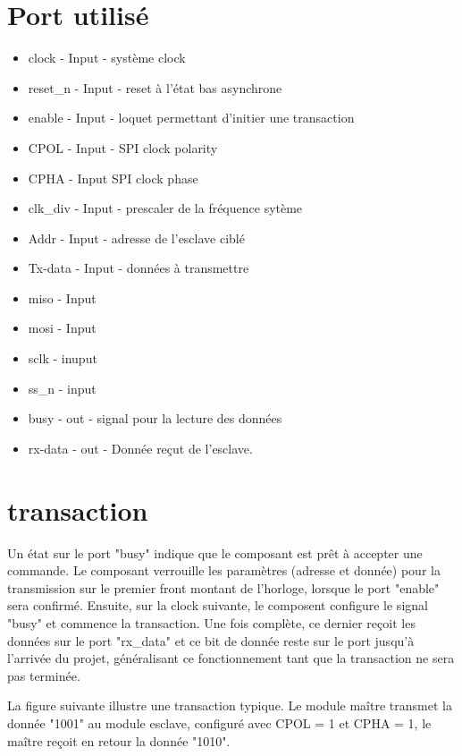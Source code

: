 \documentclass[french,a4paper,12pt]{report}
\begin{document}
	\section{Port utilisé}
		\begin{itemize}
			\item clock - Input - système clock
			\item reset\_n - Input - reset à l'état bas asynchrone
			\item enable - Input - loquet permettant d'initier une transaction
			\item CPOL - Input - SPI clock polarity
			\item CPHA - Input SPI clock phase
			\item clk\_div - Input - prescaler de la fréquence sytème
			\item Addr - Input - adresse de l'esclave ciblé
			\item Tx-data - Input - données à transmettre
			\item miso - Input
			\item mosi - Input
			\item sclk - inuput
			\item  ss\_n - input
			\item busy - out - signal pour la lecture des données
			\item rx-data - out - Donnée reçut de l'esclave.
		\end{itemize}
	
	\section{transaction}
		Un état sur le port "busy" indique que le composant est prêt à accepter une commande. Le composant verrouille les paramètres (adresse et donnée) pour la transmission sur le premier front montant de l'horloge, lorsque le port "enable" sera confirmé. Ensuite, sur la clock suivante, le composent configure le signal "busy" et commence la transaction. Une fois complète, ce dernier reçoit les données sur le port "rx\_data" et ce bit de donnée reste sur le port jusqu'à l'arrivée du projet, généralisant ce fonctionnement tant que la transaction ne sera pas terminée.		
		
		La figure suivante illustre une transaction typique. Le module maître transmet la donnée "1001" au module esclave, configuré avec CPOL = 1 et CPHA = 1, le maître reçoit en retour la donnée "1010".
		
\end{document}
